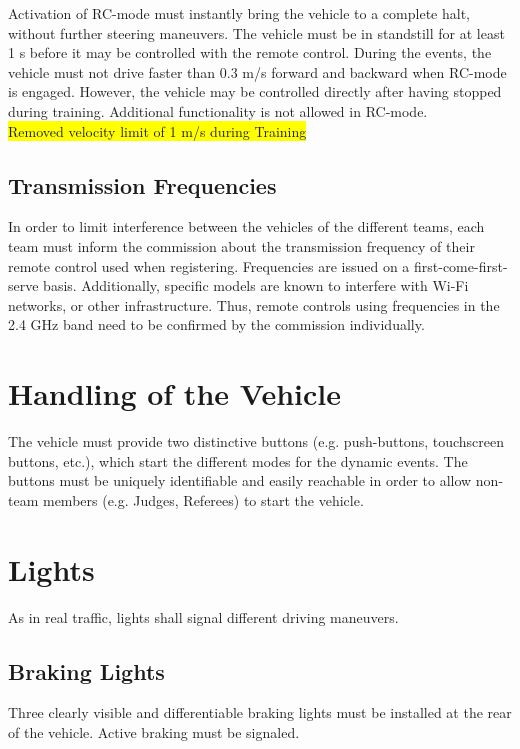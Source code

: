 \documentclass[a4paper]{report}
\begin{document}
Activation of RC-mode must instantly bring the vehicle to a complete halt, without further steering maneuvers. The vehicle must be in standstill for at least 1 s before it may be controlled with the remote control. During the events, the vehicle must not drive faster than 0.3 m/s forward and backward when RC-mode is engaged. However, the vehicle may be controlled directly after having stopped during training. Additional functionality is not allowed in RC-mode.
\bigskip\\
\colorbox{yellow}{Removed velocity limit of 1 m/s during Training}

\subsection{Transmission Frequencies} 

In order to limit interference between the vehicles of the different teams, each team must inform the commission about the transmission frequency of their remote control used when registering. Frequencies are issued on a first-come-first-serve basis. Additionally, specific models are known to interfere with Wi-Fi networks, or other infrastructure. Thus, remote controls using frequencies in the 2.4 GHz band need to be confirmed by the commission individually. 

\section{Handling of the Vehicle}

The vehicle must provide two distinctive buttons (e.g. push-buttons, touchscreen buttons, etc.), which start the different modes for the dynamic events. The buttons must be uniquely identifiable and easily reachable in order to allow non-team members (e.g. Judges, Referees) to start the vehicle. 

\section{Lights}

As in real traffic, lights shall signal different driving maneuvers. 

\subsection{Braking Lights} 

Three clearly visible and differentiable braking lights must be installed at the rear of the vehicle. Active braking must be signaled. 
\end{document}
